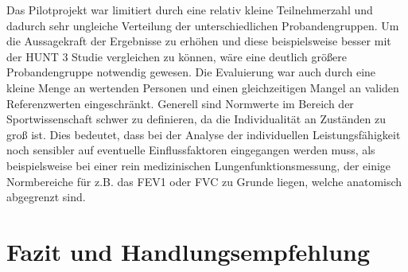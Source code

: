 Das Pilotprojekt war limitiert durch eine relativ kleine Teilnehmerzahl und dadurch sehr ungleiche Verteilung der unterschiedlichen Probandengruppen. Um die Aussagekraft der Ergebnisse zu erhöhen und diese beispielsweise besser mit der HUNT 3 Studie vergleichen zu können, wäre eine deutlich größere Probandengruppe notwendig gewesen. Die Evaluierung war auch durch eine kleine Menge an wertenden Personen und einen gleichzeitigen Mangel an validen Referenzwerten eingeschränkt. Generell sind Normwerte im Bereich der Sportwissenschaft schwer zu definieren, da die Individualität an Zuständen zu groß ist. Dies bedeutet, dass bei der Analyse der individuellen Leistungsfähigkeit noch sensibler auf eventuelle Einflussfaktoren eingegangen werden muss, als beispielsweise bei einer rein medizinischen Lungenfunktionsmessung, der einige Normbereiche für z.B. das \ac{FEV1} oder \ac{FVC} zu Grunde liegen, welche anatomisch abgegrenzt sind.

\section{Fazit und Handlungsempfehlung}

